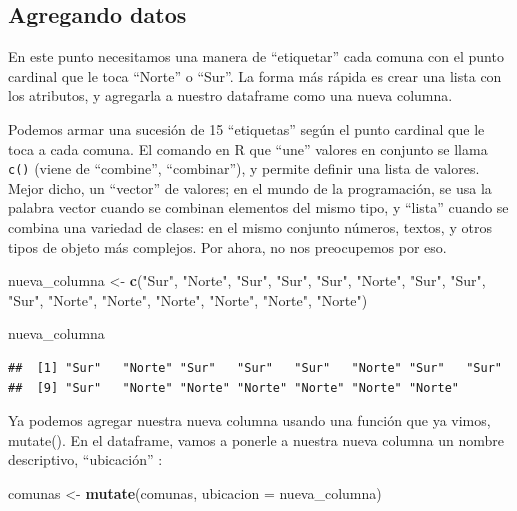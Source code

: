 \documentclass[]{book}
\newenvironment{Shaded}{\begin{snugshade}}{\end{snugshade}}
\newcommand{\KeywordTok}[1]{\textcolor[rgb]{0.13,0.29,0.53}{\textbf{#1}}}
\newcommand{\DataTypeTok}[1]{\textcolor[rgb]{0.13,0.29,0.53}{#1}}
\newcommand{\StringTok}[1]{\textcolor[rgb]{0.31,0.60,0.02}{#1}}
\newcommand{\NormalTok}[1]{#1}
\begin{document}
\subsection{Agregando datos}\label{agregando-datos}

En este punto necesitamos una manera de ``etiquetar'' cada comuna con el
punto cardinal que le toca ``Norte'' o ``Sur''. La forma más rápida es
crear una lista con los atributos, y agregarla a nuestro dataframe como
una nueva columna.

Podemos armar una sucesión de 15 ``etiquetas'' según el punto cardinal
que le toca a cada comuna. El comando en R que ``une'' valores en
conjunto se llama \texttt{c()} (viene de ``combine'', ``combinar''), y
permite definir una lista de valores. Mejor dicho, un ``vector'' de
valores; en el mundo de la programación, se usa la palabra vector cuando
se combinan elementos del mismo tipo, y ``lista'' cuando se combina una
variedad de clases: en el mismo conjunto números, textos, y otros tipos
de objeto más complejos. Por ahora, no nos preocupemos por eso.

\begin{Shaded}
\begin{Highlighting}[]
\NormalTok{nueva_columna <-}\StringTok{ }\KeywordTok{c}\NormalTok{(}\StringTok{"Sur"}\NormalTok{, }\StringTok{"Norte"}\NormalTok{, }\StringTok{"Sur"}\NormalTok{, }\StringTok{"Sur"}\NormalTok{, }\StringTok{"Sur"}\NormalTok{, }\StringTok{"Norte"}\NormalTok{, }\StringTok{"Sur"}\NormalTok{, }\StringTok{"Sur"}\NormalTok{, }\StringTok{"Sur"}\NormalTok{, }\StringTok{"Norte"}\NormalTok{, }\StringTok{"Norte"}\NormalTok{, }\StringTok{"Norte"}\NormalTok{, }\StringTok{"Norte"}\NormalTok{, }\StringTok{"Norte"}\NormalTok{, }\StringTok{"Norte"}\NormalTok{)}

\NormalTok{nueva_columna}
\end{Highlighting}
\end{Shaded}

\begin{verbatim}
##  [1] "Sur"   "Norte" "Sur"   "Sur"   "Sur"   "Norte" "Sur"   "Sur"  
##  [9] "Sur"   "Norte" "Norte" "Norte" "Norte" "Norte" "Norte"
\end{verbatim}

Ya podemos agregar nuestra nueva columna usando una función que ya
vimos, mutate(). En el dataframe, vamos a ponerle a nuestra nueva
columna un nombre descriptivo, ``ubicación'' :

\begin{Shaded}
\begin{Highlighting}[]
\NormalTok{comunas <-}\StringTok{ }\KeywordTok{mutate}\NormalTok{(comunas, }\DataTypeTok{ubicacion =}\NormalTok{ nueva_columna)}
\end{Highlighting}
\end{Shaded}
\end{document}

